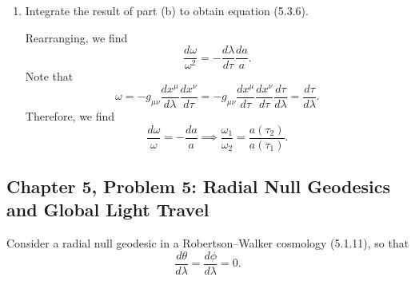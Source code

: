 \begin{enumerate}[label=\alph*)]
    \item Integrate the result of part (b) to obtain equation (5.3.6).
    \begin{solution}
        Rearranging, we find
        \begin{equation}
            \frac{d\omega}{\omega^2} = - \frac{d\lambda}{d\tau}\frac{da }{a}.
        \end{equation}
        Note that
        \begin{equation}
            \omega = - g_{\mu\nu}\frac{dx^\mu}{d\lambda}\frac{dx^\nu}{d\tau} =  - g_{\mu\nu}\frac{dx^\mu}{d\tau}\frac{dx^\nu}{d\tau}\frac{d\tau}{d\lambda} = \frac{d\tau}{d\lambda}.
        \end{equation}
        Therefore, we find
        \begin{equation}
            \frac{d\omega}{\omega} = -\frac{da}{a} \implies \frac{\omega_1}{\omega_2} = \frac{a(\tau_2)}{a(\tau_1)}.
        \end{equation}
    \end{solution}
\end{enumerate}

\subsection{Chapter 5, Problem 5: Radial Null Geodesics and Global Light Travel}

Consider a radial null geodesic in a Robertson--Walker cosmology (5.1.11), so
that
\begin{equation}
    \frac{d\theta}{d\lambda}
    =\frac{d\phi}{d\lambda}=0.
\end{equation}

